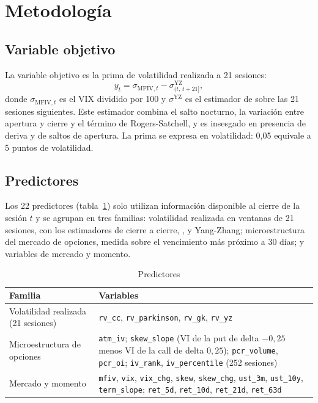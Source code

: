 \documentclass[11pt,a4paper]{article}
\begin{document}
\section{Metodología}\label{sec:metodo}

\subsection{Variable objetivo}

La variable objetivo es la prima de volatilidad realizada a 21 sesiones:
\begin{equation}\label{eq:target}
  y_t = \sigma_{\text{MFIV},t} - \sigma^{\text{YZ}}_{(t,\,t+21]},
\end{equation}
donde $\sigma_{\text{MFIV},t}$ es el VIX dividido por 100 y $\sigma^{\text{YZ}}$ es el estimador de \citet{yangzhang2000} sobre las 21 sesiones siguientes. Este estimador combina el salto nocturno, la variación entre apertura y cierre y el término de Rogers-Satchell, y es insesgado en presencia de deriva y de saltos de apertura. La prima se expresa en volatilidad: 0,05 equivale a 5 puntos de volatilidad.

\subsection{Predictores}

Los 22 predictores (tabla~\ref{tab:features}) solo utilizan información disponible al cierre de la sesión $t$ y se agrupan en tres familias: volatilidad realizada en ventanas de 21 sesiones, con los estimadores de cierre a cierre, \citet{parkinson1980}, \citet{garmanklass1980} y Yang-Zhang; microestructura del mercado de opciones, medida sobre el vencimiento más próximo a 30 días; y variables de mercado y momento.

\begin{table}[!htbp]
\centering
\caption{Predictores}\label{tab:features}
\small
\begin{tabularx}{\linewidth}{@{}lX@{}}
\toprule
Familia & Variables \\
\midrule
Volatilidad realizada (21 sesiones) & \texttt{rv\_cc}, \texttt{rv\_parkinson}, \texttt{rv\_gk}, \texttt{rv\_yz} \\
Microestructura de opciones & \texttt{atm\_iv}; \texttt{skew\_slope} (VI de la put de delta $-0{,}25$ menos VI de la call de delta $0{,}25$); \texttt{pcr\_volume}, \texttt{pcr\_oi}; \texttt{iv\_rank}, \texttt{iv\_percentile} (252 sesiones) \\
Mercado y momento & \texttt{mfiv}, \texttt{vix}, \texttt{vix\_chg}, \texttt{skew}, \texttt{skew\_chg}, \texttt{ust\_3m}, \texttt{ust\_10y}, \texttt{term\_slope}; \texttt{ret\_5d}, \texttt{ret\_10d}, \texttt{ret\_21d}, \texttt{ret\_63d} \\
\bottomrule
\end{tabularx}
\end{table}
\end{document}
